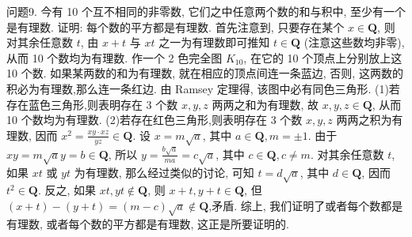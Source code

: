 问题9. 今有 10 个互不相同的非零数, 它们之中任意两个数的和与积中, 至少有一个是有理数.
证明: 每个数的平方都是有理数.
首先注意到, 只要存在某个 $x \in \mathbf{Q}$, 则对其余任意数 $t$, 由 $x+t$ 与 $x t$ 之一为有理数即可推知 $t \in \mathbf{Q}$ (注意这些数均非零), 从而 10 个数均为有理数.
作一个 2 色完全图 $K_{10}$, 在它的 10 个顶点上分别放上这 10 个数.
如果某两数的和为有理数, 就在相应的顶点间连一条蓝边, 否则, 这两数的积必为有理数,那么连一条红边.
由 Ramsey 定理得, 该图中必有同色三角形.
(1)若存在蓝色三角形,则表明存在 3 个数 $x, y, z$ 两两之和为有理数, 故 $x, y, z \in \mathbf{Q}$, 从而 10 个数均为有理数.
(2)若存在红色三角形,则表明存在 3 个数 $x, y, z$ 两两之积为有理数, 因而 $x^2=\frac{x y \cdot x z}{y z} \in \mathbf{Q}$. 设 $x=m \sqrt{a}$, 其中 $a \in \mathbf{Q}, m= \pm 1$. 由于 $x y= m \sqrt{a} y=b \in \mathbf{Q}$, 所以 $y=\frac{b \sqrt{a}}{m a}=c \sqrt{a}$, 其中 $c \in \mathbf{Q}, c \neq m$. 对其余任意数 $t$, 如果 $x t$ 或 $y t$ 为有理数, 那么经过类似的讨论, 可知 $t=d \sqrt{a}$, 其中 $d \in \mathbf{Q}$, 因而 $t^2 \in \mathbf{Q}$. 反之, 如果 $x t, y t \notin \mathbf{Q}$, 则 $x+t, y+t \in \mathbf{Q}$, 但 $(x+t)-(y+t)= (m-c) \sqrt{a} \notin \mathbf{Q}$,矛盾.
综上, 我们证明了或者每个数都是有理数, 或者每个数的平方都是有理数, 这正是所要证明的.



